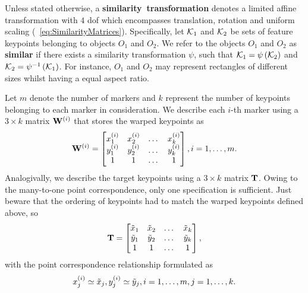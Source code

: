 Unless stated otherwise, a \mbox{\textbf{similarity transformation}} denotes a limited affine transformation with $4$ \gls{dof} which encompasses translation, rotation and uniform scaling (\eqtext{}~\ref{eq:SimilarityMatrices}). Specifically, let $\mathcal{K}_1$ and $\mathcal{K}_2$ be sets of feature keypoints belonging to objects $O_1$ and $O_2$. We refer to the objects $O_1$ and $O_2$ as \mbox{\textbf{similar}} if there exists a similarity transformation $\psi$, such that $\mathcal{K}_1 = {\psi} \left( \mathcal{K}_2 \right)$ and $\mathcal{K}_2 = {\psi^{-1}} \left( \mathcal{K}_1 \right)$. For instance, $O_1$ and $O_2$ may represent rectangles of different sizes whilst having a equal aspect ratio.

Let $m$ denote the number of markers and $k$ represent the number of keypoints belonging to each marker in consideration. We describe each $i$-th marker using a $3 \times k$ matrix ${\mathbf{W}}^{\left( {i} \right)}$ that stores the warped keypoints as
\begin{equation}
    {\mathbf{W}}^{\left( {i} \right)} =
    \begin{bmatrix}
        {x}_{1}^{\left( {i} \right)} & {x}_{2}^{\left( {i} \right)} & \dots & {x}_{k}^{\left( {i} \right)} \\
        {y}_{1}^{\left( {i} \right)} & {y}_{2}^{\left( {i} \right)} & \dots & {y}_{k}^{\left( {i} \right)} \\
        1                         & 1                         & \dots & 1
    \end{bmatrix},
    i = 1, \dots, m.
\end{equation}
Analogivally, we describe the target keypoints using a $3 \times k$ matrix $\mathbf{T}$. Owing to the many-to-one point correspondence, only one specification is sufficient. Just beware that the ordering of keypoints had to match the warped keypoints defined above, so
\begin{equation}
    \mathbf{T} =
    \begin{bmatrix}
        \tilde{x}_1 & \tilde{x}_2 & \dots & \tilde{x}_k \\
        \tilde{y}_1 & \tilde{y}_2 & \dots & \tilde{y}_k \\
        1           & 1           & \dots & 1
    \end{bmatrix},
\end{equation}
with the point correspondence relationship formulated as
\begin{equation}
    {x}_{j}^{\left( {i} \right)} \simeq \tilde{x}_j, {y}_{j}^{\left( {i} \right)} \simeq \tilde{y}_j, i = 1, \dots, m, j = 1, \dots, k.
\end{equation}
